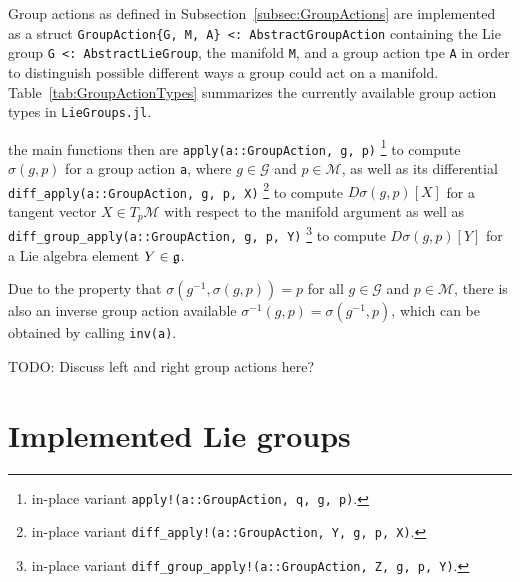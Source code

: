 \documentclass{juliacon}
\begin{document}
Group actions as defined in Subsection~\ref{subsec:GroupActions} are implemented as a struct \verb|GroupAction{G, M, A} <: AbstractGroupAction| containing the Lie group \verb|G <: AbstractLieGroup|, the manifold \verb|M|, and a group action tpe \verb|A| in order to distinguish possible different ways a group could act on a manifold.
Table~\ref{tab:GroupActionTypes} summarizes the currently available group action types in \verb|LieGroups.jl|.

the main functions then are \verb|apply(a::GroupAction, g, p)|%
\footnote{in-place variant \texttt{apply!(a::GroupAction, q, g, p)}.}
to compute \(\sigma(g, p)\) for a group action \verb|a|, where $g\in \mathcal G$ and $p \in \mathcal M$, as well as its differential \verb|diff_apply(a::GroupAction, g, p, X)|%
\footnote{in-place variant \texttt{diff\_apply!(a::GroupAction, Y, g, p, X)}.}
to compute \(D\sigma(g, p)[X]\) for a tangent vector \(X \in T_p\mathcal M\) with respect to the manifold argument as well as \verb|diff_group_apply(a::GroupAction, g, p, Y)|%
\footnote{in-place variant \texttt{diff\_group\_apply!(a::GroupAction, Z, g, p, Y)}.}
to compute \(D\sigma(g, p)[Y]\) for a Lie algebra element \(Y \in \frak g\).

Due to the property that \(\sigma(g^{-1}, \sigma(g, p)) = p\) for all \(g \in \mathcal{G}\) and \(p \in \mathcal{M}\), there is also an inverse group action available $\sigma^{-1}(g, p) = \sigma(g^{-1}, p)$, which can be obtained by calling \verb|inv(a)|.

{\color{red} TODO: Discuss left and right group actions here?}

\section{Implemented Lie groups}\label{sec:LieGroups}
\end{document}
